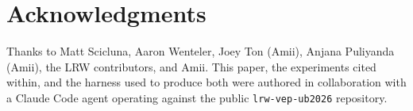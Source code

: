 \documentclass{article}
\begin{document}
\section*{Acknowledgments}

Thanks to Matt Scicluna, Aaron Wenteler, Joey Ton (Amii), Anjana Puliyanda
(Amii), the LRW contributors, and Amii. This paper, the experiments cited
within, and the harness used to produce both were authored in collaboration
with a Claude Code agent operating against the public
\texttt{lrw-vep-ub2026} repository.



\end{document}
